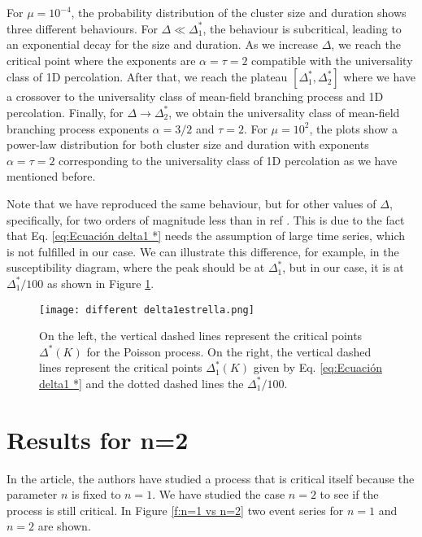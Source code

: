 For $\mu=10^{-4}$, the probability distribution of the cluster size and duration shows three different behaviours. For $\Delta\ll\Delta_1^*$, the behaviour is subcritical, leading to
an exponential decay for the size and duration. As we increase $\Delta$, we reach the critical point where the exponents are $\alpha=\tau=2$ compatible with the universality class
of 1D percolation. After that, we reach the plateau $[\Delta_1^*,\Delta_2^*]$ where we have a crossover to the universality class of mean-field branching process and 1D percolation. 
Finally, for $\Delta\to\Delta_2^*$, we obtain the universality class of mean-field branching process exponents $\alpha=3/2$ and $\tau=2$. 
For $\mu=10^2$, the plots show a power-law distribution for both cluster size and duration with exponents $\alpha=\tau=2$ corresponding to the universality class of 1D percolation as we have
mentioned before.

Note that we have reproduced the same behaviour, but for other values of $\Delta$, specifically, for two orders of magnitude less than in ref \cite{notarmuzi2021percolation}. This is due 
to the fact that Eq. \ref{eq:Ecuación delta1 *} needs the assumption of large time series, which is not fulfilled in our case. 
We can illustrate this difference,
for example, in the susceptibility diagram, where the peak should be at $\Delta_1^*$, but in our case, it is at $\Delta_1^*/100$ as shown in Figure \ref{f:different delta1estrella}. 


\begin{figure}[H]
\centering
\texttt{[image: different delta1estrella.png]}
\caption{On the left, the vertical dashed lines represent the critical points $\Delta^*(K)$ for the Poisson process. On the right, the vertical dashed lines represent 
the critical points $\Delta_1^*(K)$ given by Eq. \ref{eq:Ecuación delta1 *} and the dotted dashed lines the $\Delta_1^*/100$.} 
\label{f:different delta1estrella}
\end{figure}


\section{Results for n=2}

In the article, the authors have studied a process that is critical itself because the parameter $n$ is fixed to $n=1$. We have studied the case $n=2$ to see if the process is still critical. 
In Figure \ref{f:n=1 vs n=2} two event series for $n=1$ and $n=2$ are shown. 

